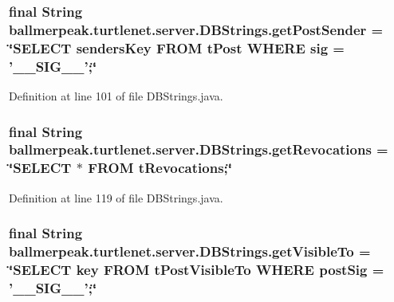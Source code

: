 \hypertarget{classballmerpeak_1_1turtlenet_1_1server_1_1DBStrings_ad87c5a646e57a7280c16bc34c599eba2}{
\subsubsection[{get\-Post\-Sender}]{\setlength{\rightskip}{0pt plus 5cm}final String ballmerpeak.\-turtlenet.\-server.\-D\-B\-Strings.\-get\-Post\-Sender = \char`\"{}S\-E\-L\-E\-C\-T senders\-Key F\-R\-O\-M t\-Post W\-H\-E\-R\-E sig = '\-\_\-\-\_\-\-S\-I\-G\-\_\-\-\_\-';\char`\"{}\hspace{0.3cm}{\ttfamily [static]}}}\label{classballmerpeak_1_1turtlenet_1_1server_1_1DBStrings_ad87c5a646e57a7280c16bc34c599eba2}


Definition at line 101 of file D\-B\-Strings.\-java.

\hypertarget{classballmerpeak_1_1turtlenet_1_1server_1_1DBStrings_a8dc5636da5576be650e1de5c08109bc8}{
\subsubsection[{get\-Revocations}]{\setlength{\rightskip}{0pt plus 5cm}final String ballmerpeak.\-turtlenet.\-server.\-D\-B\-Strings.\-get\-Revocations = \char`\"{}S\-E\-L\-E\-C\-T $\ast$ F\-R\-O\-M t\-Revocations;\char`\"{}\hspace{0.3cm}{\ttfamily [static]}}}\label{classballmerpeak_1_1turtlenet_1_1server_1_1DBStrings_a8dc5636da5576be650e1de5c08109bc8}


Definition at line 119 of file D\-B\-Strings.\-java.

\hypertarget{classballmerpeak_1_1turtlenet_1_1server_1_1DBStrings_a977f96408405a039b29ea0375f014129}{
\subsubsection[{get\-Visible\-To}]{\setlength{\rightskip}{0pt plus 5cm}final String ballmerpeak.\-turtlenet.\-server.\-D\-B\-Strings.\-get\-Visible\-To = \char`\"{}S\-E\-L\-E\-C\-T key F\-R\-O\-M t\-Post\-Visible\-To W\-H\-E\-R\-E post\-Sig = '\-\_\-\-\_\-\-S\-I\-G\-\_\-\-\_\-';\char`\"{}\hspace{0.3cm}{\ttfamily [static]}}}\label{classballmerpeak_1_1turtlenet_1_1server_1_1DBStrings_a977f96408405a039b29ea0375f014129}


